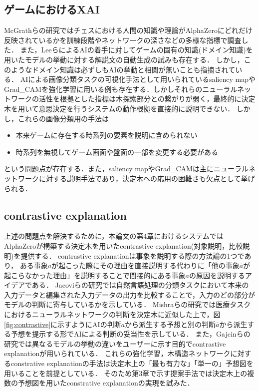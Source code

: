 \subsection{ゲームにおけるXAI}
McGrathらの研究\cite{DeepMind}ではチェスにおける人間の知識や理論がAlphaZeroにどれだけ反映されているかを訓練段階やネットワークの深さなどの多様な指標で調査した．
また，Leeら\cite{ChessComments}によるAIの着手に対してゲームの固有の知識(ドメイン知識)を用いたモデルの挙動に対する解説文の自動生成の試みも存在する．
しかし，このようなドメイン知識は必ずしもAIの挙動と相関が無いことも指摘されている\cite{DeepMind}．
AIによる画像分類タスクの可視化手法として用いられているsaliency map\cite{saliency}やGrad\_CAM\cite{Grad-CAM}を強化学習に用いる例も存在する\cite{gl}\cite{atari-saliency}\cite{visualize}．しかしそれらのニューラルネットワークの活性を根拠とした指標は木探索部分との繋がりが弱く，最終的に決定木を用いて意思決定を行うシステムの動作根拠を直接的に説明できない．
しかし，これらの画像分類用の手法は
\begin{itemize}
	\item 本来ゲームに存在する時系列の要素を説明に含められない
	\item 時系列を無視してゲーム画面や盤面の一部を変更する必要がある
\end{itemize}
という問題点が存在する．また，saliency mapやGrad\_CAMは主にニューラルネットワークに対する説明手法であり，決定木への応用の困難さも欠点として挙げられる．

\subsection{contrastive explanation}
上述の問題点を解決するために，本論文の第4章におけるシステムではAlphaZeroが構築する決定木を用いたcontrastive explanation(対象説明，比較説明)を提供する．
contrastive explanationは事象を説明する際の方法論の1つであり，
ある事象$a$が起こった際にその理由を直接説明する代わりに「他の事象$\bar{a}$が起こらなかった理由」を説明することで間接的にある事象$a$の原因を説明するアイデアである\cite{contrastive}．
Jacoviらの研究\cite{contrastive}では自然言語処理の分類タスクにおいて本来の入力データと編集された入力データの出力を比較することで，入力のどの部分がモデルの判断に寄与しているかを示している．
Mishraらの研究\cite{whyNot}では医療タスクにおけるニューラルネットワークの判断を決定木に近似した上で，図\ref{fig:contrastive}に示すようにAIの判断$a$から派生する予想と別の判断$\bar{a}$から派生する予想を提示する形でAIによる判断の妥当性を示している．
また，Gajcinらの研究\cite{preference}では異なるモデルの挙動の違いをユーザーに示す目的でcontrastive explanationが用いられている．
これらの強化学習，木構造ネットワークに対するconstrative explanationの手法は決定木上の「最も有力な」「単一の」予想図を用いることを前提としている．
そのため第3章で示す提案手法では決定木上の複数の予想図を用いたconstrative explanationの実現を試みた．

